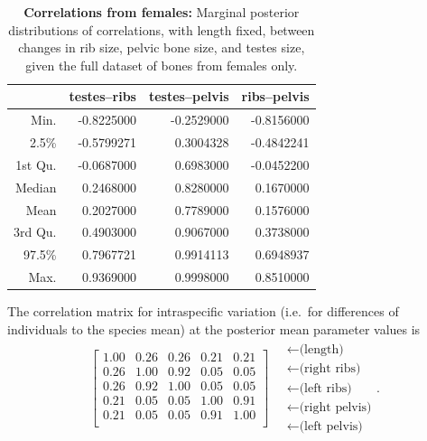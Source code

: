 \documentclass[12pt]{article}
\begin{document}


\begin{table}[ht]
\centering
\begin{tabular}{rrrr}
  \hline
        &  testes--ribs & testes--pelvis & ribs--pelvis \\
  \hline
 Min. &    -0.8225000  &  -0.2529000 & -0.8156000 \\
 2.5\% &   -0.5799271  &   0.3004328 & -0.4842241 \\
 1st Qu. & -0.0687000  &   0.6983000 & -0.0452200 \\
 Median &   0.2468000  &   0.8280000 &  0.1670000 \\
 Mean &     0.2027000  &   0.7789000 &  0.1576000 \\
 3rd Qu. &  0.4903000  &   0.9067000 &  0.3738000 \\
 97.5\%  &  0.7967721  &   0.9914113 &  0.6948937 \\
 Max. &     0.9369000  &   0.9998000 &  0.8510000 \\
   \hline
\end{tabular}
\caption{\textbf{Correlations from females:} Marginal posterior distributions of correlations, with length fixed,
  between changes in rib size, pelvic bone size, and testes size,
  given the full dataset of bones from females only.
  \label{tab:females_posterior_cors}
}
\end{table}

The correlation matrix for intraspecific variation 
(i.e.\ for differences of individuals to the species mean)
at the posterior mean parameter values is
\begin{align}
\begin{bmatrix}
   1.00 & 0.26 & 0.26 & 0.21 & 0.21 \\ 
   0.26 & 1.00 & 0.92 & 0.05 & 0.05 \\ 
   0.26 & 0.92 & 1.00 & 0.05 & 0.05 \\ 
   0.21 & 0.05 & 0.05 & 1.00 & 0.91 \\ 
   0.21 & 0.05 & 0.05 & 0.91 & 1.00 \\ 
 \end{bmatrix}
\quad \begin{matrix}
  \leftarrow \text{(length)} \\
  \leftarrow \text{(right ribs)} \\
  \leftarrow \text{(left ribs)} \\
  \leftarrow \text{(right pelvis)} \\
  \leftarrow \text{(left pelvis)} 
\end{matrix}  .
\end{align}
\end{document}
